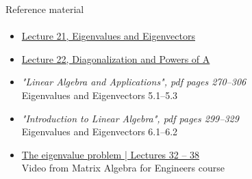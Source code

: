 \documentclass[aspectratio=169]{beamer}
\newcommand{\fbckg}[1]{\usebackgroundtemplate{\texttt{[image: \#1]}}}%
\begin{document}
\begin{frame}[t]{Reference material}
    \framesubtitle{}
    \Large
    \vspace{-0.5cm}
    \begin{itemize}
        \item \href{https://www.youtube.com/watch?v=lXNXrLcoerU&list=PL49CF3715CB9EF31D&index=21}{Lecture 21, Eigenvalues and Eigenvectors}
        \item \href{https://www.youtube.com/watch?v=13r9QY6cmjc&list=PL49CF3715CB9EF31D&index=22}{Lecture 22, Diagonalization and Powers of A}
        \item \textit{"Linear Algebra and Applications", pdf pages 270--306 }\\ Eigenvalues and Eigenvectors 5.1--5.3
        \item \textit{"Introduction to Linear Algebra", pdf pages 299--329 }\\ Eigenvalues and Eigenvectors 6.1--6.2
        \item  \href{https://www.youtube.com/watch?v=29keVZGvqME&list=PLkZjai-2Jcxlg-Z1roB0pUwFU-P58tvOx&index=34}{The eigenvalue problem | Lectures 32 -- 38}\\ Video from Matrix Algebra for Engineers course
    \end{itemize}
\end{frame}

\fbckg{fibeamer/figs/last_page.png}
\frame[plain]{}
\end{document}
